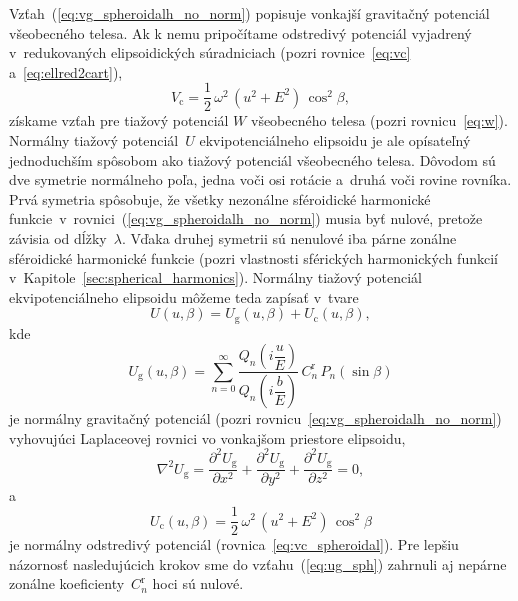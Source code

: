 \documentclass[a4paper, 12pt]{book}
\newcommand{\gidx}{\mathrm g}
\newcommand{\cidx}{\mathrm c}
\begin{document}
Vzťah~(\ref{eq:vg_spheroidalh_no_norm}) popisuje vonkajší gravitačný potenciál 
všeobecného telesa.  Ak k nemu pripočítame odstredivý potenciál vyjadrený 
v~redukovaných elipsoidických súradniciach (pozri rovnice~\ref{eq:vc} 
a~\ref{eq:ellred2cart}),
%
\begin{equation}
\label{eq:vc_spheroidal}
V_\cidx = \frac{1}{2} \, \omega^2 \, (u^2 + E^2) \, \cos^2\beta{,}
\end{equation}
%
získame vzťah pre tiažový potenciál $W$ všeobecného telesa (pozri 
rovnicu~\ref{eq:w}).  Normálny tiažový potenciál~$U$ ekvipotenciálneho 
elipsoidu je ale opísateľný jednoduchším spôsobom ako tiažový potenciál 
všeobecného telesa.  Dôvodom sú dve symetrie normálneho poľa, jedna voči osi 
rotácie a~druhá voči rovine rovníka.  Prvá symetria spôsobuje, že všetky 
nezonálne sféroidické harmonické 
funkcie~v~rovnici~(\ref{eq:vg_spheroidalh_no_norm}) musia byť nulové, pretože 
závisia od dĺžky~$\lambda$.  Vďaka druhej symetrii sú nenulové iba párne 
zonálne sféroidické harmonické funkcie (pozri vlastnosti sférických 
harmonických funkcií v~Kapitole~\ref{sec:spherical_harmonics}).  Normálny 
tiažový potenciál ekvipotenciálneho elipsoidu môžeme teda zapísať v~tvare
%
\begin{equation}
\label{eq:u_sph}
U(u, \beta) = U_\gidx(u, \beta) + U_\cidx(u, \beta){,}
\end{equation}
%
kde
%
\begin{equation}
\label{eq:ug_sph}
U_\gidx(u, \beta) = \sum_{n = 0}^\infty \frac{Q_n\left( i \dfrac{u}{E} 
\right)}{Q_n\left( i \dfrac{b}{E} \right)} \,  C^{\mathrm{r}}_n \, 
P_n(\sin\beta)
\end{equation}
%
je normálny gravitačný potenciál (pozri 
rovnicu~\ref{eq:vg_spheroidalh_no_norm}) vyhovujúci Laplaceovej rovnici vo 
vonkajšom priestore elipsoidu,
%
\begin{equation}
\label{eq:ug_laplace_cart}
\nabla^2 U_\gidx = \frac{\partial^2 U_\gidx}{\partial x^2} + \frac{\partial^2 
U_\gidx}{\partial y^2} + \frac{\partial^2 U_\gidx}{\partial z^2} = 0{,}
\end{equation}
%
a
%
\begin{equation}
\label{eq:uc_sph}
U_\cidx(u, \beta) = \frac{1}{2} \, \omega^2 \, (u^2 + E^2) \, \cos^2\beta
\end{equation}
%
je normálny odstredivý potenciál (rovnica~\ref{eq:vc_spheroidal}).  Pre lepšiu 
názornosť nasledujúcich krokov sme do vzťahu~(\ref{eq:ug_sph}) zahrnuli aj 
nepárne zonálne koeficienty~$C^{\mathrm{r}}_n$ hoci sú nulové.
\end{document}
